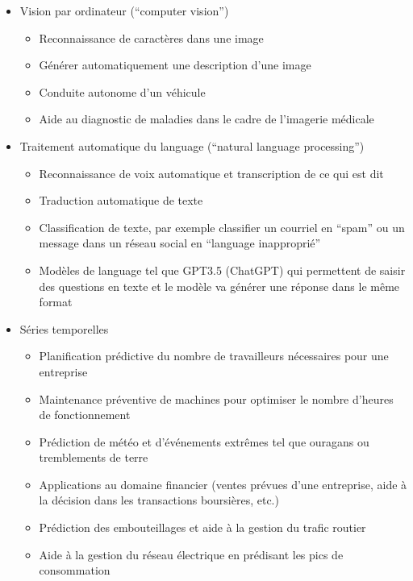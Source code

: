 \begin{itemize}
    \item Vision par ordinateur (``computer vision'')
    \begin{itemize}
        \item Reconnaissance de caractères dans une image
        \item Générer automatiquement une description d'une image
        \item Conduite autonome d'un véhicule
        \item Aide au diagnostic de maladies dans le cadre de l'imagerie médicale
    \end{itemize}
    
    \item Traitement automatique du language (``natural language processing'')
    \begin{itemize}
        \item Reconnaissance de voix automatique et transcription de ce qui est dit
        \item Traduction automatique de texte
        \item Classification de texte, par exemple classifier un courriel en ``spam'' ou un message dans un réseau social en ``language inapproprié''
        \item Modèles de language tel que GPT3.5 (ChatGPT) qui permettent de saisir des questions en texte et le modèle va générer une réponse dans le même format
    \end{itemize}
    
    \item Séries temporelles
    \begin{itemize}
        \item Planification prédictive du nombre de travailleurs nécessaires pour une entreprise
        \item Maintenance préventive de machines pour optimiser le nombre d'heures de fonctionnement
        \item Prédiction de météo et d'événements extrêmes tel que ouragans ou tremblements de terre
        \item Applications au domaine financier (ventes prévues d'une entreprise, aide à la décision dans les transactions boursières, etc.)
        \item Prédiction des embouteillages et aide à la gestion du trafic routier
        \item Aide à la gestion du réseau électrique en prédisant les pics de consommation
    \end{itemize}
\end{itemize}

